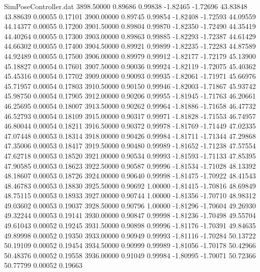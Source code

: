 \begin{filecontents}{SimPoseController.dat}
3898.50000    0.89686    0.99838    -1.82465   -1.72696   43.83848   43.88639    0.00055    0.17101
3900.00000    0.89745    0.99854    -1.82408   -1.72593   44.09559   44.14377    0.00055    0.17200
3901.50000    0.89804    0.99870    -1.82350   -1.72490   44.35419   44.40264    0.00055    0.17300
3903.00000    0.89863    0.99885    -1.82293   -1.72387   44.61429   44.66302    0.00055    0.17400
3904.50000    0.89921    0.99899    -1.82235   -1.72283   44.87589   44.92489    0.00055    0.17500
3906.00000    0.89979    0.99912    -1.82177   -1.72179   45.13900   45.18827    0.00054    0.17601
3907.50000    0.90036    0.99924    -1.82119   -1.72075   45.40362   45.45316    0.00054    0.17702
3909.00000    0.90093    0.99935    -1.82061   -1.71971   45.66976   45.71957    0.00054    0.17803
3910.50000    0.90150    0.99946    -1.82003   -1.71867   45.93742   45.98750    0.00054    0.17905
3912.00000    0.90206    0.99955    -1.81945   -1.71763   46.20661   46.25695    0.00054    0.18007
3913.50000    0.90262    0.99964    -1.81886   -1.71658   46.47732   46.52793    0.00054    0.18109
3915.00000    0.90317    0.99971    -1.81828   -1.71553   46.74957   46.80044    0.00054    0.18211
3916.50000    0.90372    0.99978    -1.81769   -1.71449   47.02335   47.07448    0.00053    0.18314
3918.00000    0.90426    0.99984    -1.81711   -1.71344   47.29868   47.35006    0.00053    0.18417
3919.50000    0.90480    0.99989    -1.81652   -1.71238   47.57554   47.62718    0.00053    0.18520
3921.00000    0.90534    0.99993    -1.81593   -1.71133   47.85395   47.90585    0.00053    0.18623
3922.50000    0.90587    0.99996    -1.81534   -1.71028   48.13392   48.18607    0.00053    0.18726
3924.00000    0.90640    0.99998    -1.81475   -1.70922   48.41543   48.46783    0.00053    0.18830
3925.50000    0.90692    1.00000    -1.81415   -1.70816   48.69849   48.75115    0.00053    0.18933
3927.00000    0.90744    1.00000    -1.81356   -1.70710   48.98312   49.03602    0.00053    0.19037
3928.50000    0.90796    1.00000    -1.81296   -1.70604   49.26930   49.32244    0.00053    0.19141
3930.00000    0.90847    0.99998    -1.81236   -1.70498   49.55704   49.61043    0.00052    0.19245
3931.50000    0.90898    0.99996    -1.81176   -1.70391   49.84635   49.89998    0.00052    0.19350
3933.00000    0.90949    0.99993    -1.81116   -1.70284   50.13722   50.19109    0.00052    0.19454
3934.50000    0.90999    0.99989    -1.81056   -1.70178   50.42966   50.48376    0.00052    0.19558
3936.00000    0.91049    0.99984    -1.80995   -1.70071   50.72366   50.77799    0.00052    0.19663

\end{filecontents}

